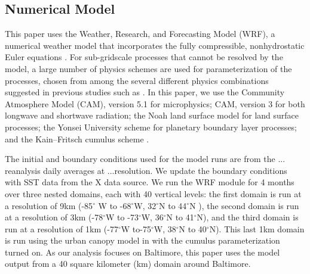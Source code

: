 \documentclass[draft,linenumbers]{agujournal}
\begin{document}
\subsection{Numerical Model}
This paper uses the Weather, Research, and Forecasting Model (WRF), a numerical weather model that incorporates the fully
compressible, nonhydrostatic Euler equations \cite{skamarock2008description}. %
For sub-gridscale processes that cannot be resolved by the model, a large number of physics schemes are 
used for parameterization of the processes, chosen from among the
several different physics combinations suggested in
previous studies such as \cite{argueso2011evaluation, giannakopoulou2012persian, efstathiou2013sensitivity, zittis2014comparison}. %
In this paper, we use the
Community Atmosphere Model (CAM), version 5.1 \citep{neale2010description} %
for microphysics; CAM, version 3 \citep{collins2004description} %
for both longwave and shortwave radiation;
the Noah land surface model \citep{ek2003implementation} %
for land surface processes; 
the Yonsei University scheme \citep{hong2006new} %
for planetary boundary layer processes;
and the Kain–Fritsch cumulus scheme \citep{kain1990one}. %

The initial and boundary conditions
used for the model runs are from the ...
reanalysis daily averages at ...resolution. We update the boundary conditions with SST data from the X data source. 
We run the WRF module for 4 months over three nested domains, each with 40 vertical levels: the first domain is run at a resolution of 9km (-85$^\circ$ W to -68$^\circ$W, 32$^\circ$N to 44$^\circ$N ), the second domain is run at a resolution of 3km (-78$^\circ$W to -73$^\circ$W, 36$^\circ$N to 41$^\circ$N), and the third domain is run at a resolution of 1km (-77$^\circ$W to-75$^\circ$W, 38$^\circ$N to 40$^\circ$N). This last 1km domain is run using the urban canopy model in \cite{chen2011integrated} with the cumulus parameterization turned on. 
As our analysis focuses on Baltimore, this paper uses the model output from a 40 square kilometer (km) domain around Baltimore.
\end{document}
